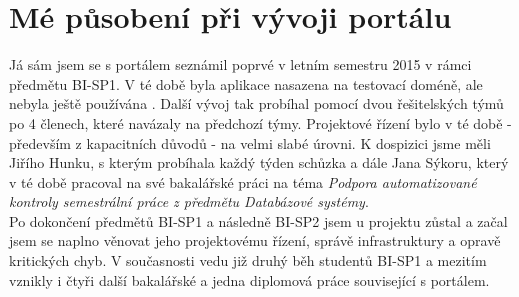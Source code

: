 \section{Mé působení při vývoji portálu} \label{intro:me}
Já sám jsem se s portálem seznámil poprvé v letním semestru 2015 v rámci předmětu BI-SP1. V té době byla aplikace nasazena na testovací doméně, ale nebyla ještě používána . Další vývoj tak probíhal pomocí dvou řešitelských týmů po 4 členech, které navázaly na předchozí týmy. Projektové řízení bylo v té době - především z kapacitních důvodů - na velmi slabé úrovni. K dospizici jsme měli Jiřího Hunku, s kterým probíhala každý týden schůzka a dále Jana Sýkoru, který v té době pracoval na své bakalářské práci na téma \emph{Podpora automatizované kontroly semestrální práce z předmětu Databázové systémy}.\\
Po dokončení předmětů BI-SP1 a následně BI-SP2 jsem u projektu zůstal a začal jsem se naplno věnovat jeho projektovému řízení, správě infrastruktury a opravě kritických chyb. V současnosti vedu již druhý běh studentů BI-SP1 a mezitím vznikly i čtyři další bakalářské a jedna diplomová práce související s portálem.